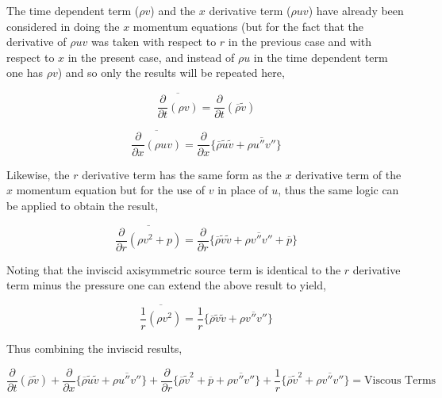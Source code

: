 	The time dependent term ($\rho v$) and the $x$ derivative term ($\rho u v$) have already been
considered in doing the $x$ momentum equations (but for the fact that the derivative of $\rho u v$ was taken
with respect to $r$ in the previous case and with respect to $x$ in the present case, and instead of $\rho u$
in the time dependent term one has $\rho v$) and so only the results will be repeated here,

\begin{displaymath}
	\overline{\frac{\partial}{\partial t}(\rho v)} = \frac{\partial}{\partial t}(\overline{\rho}\tilde{v})
\end{displaymath}

\begin{displaymath}
	\overline{\frac{\partial}{\partial x}(\rho uv)} = \frac{\partial}{\partial x}\Big\{\overline{\rho}\tilde{u}\tilde{v} +
	\overline{\rho u'' v''}\Big\}
\end{displaymath}

	Likewise, the $r$ derivative term has the same form as the $x$ derivative term of the $x$ momentum equation
but for the use of $v$ in place of $u$, thus the same logic can be applied to obtain the result,

\begin{displaymath}
	\overline{\frac{\partial}{\partial r}(\rho v^2 + p)} = \frac{\partial}{\partial r}\Big\{
	\overline{\rho}\tilde{v}\tilde{v} + \overline{\rho v'' v''} + \overline{p}\Big\}
\end{displaymath}

	Noting that the inviscid axisymmetric source term is identical to the $r$ derivative term minus the 
pressure one can extend the above result to yield,

\begin{displaymath}
	\overline{\frac{1}{r}(\rho v^2)} = \frac{1}{r}\Big\{
	\overline{\rho}\tilde{v}\tilde{v} + \overline{\rho v'' v''}\Big\}
\end{displaymath}

	Thus combining the inviscid results,

\begin{equation}
	\frac{\partial}{\partial t}(\overline{\rho}\tilde{v}) + \frac{\partial}{\partial x}\Big\{
	\overline{\rho}\tilde{u}\tilde{v} + \overline{\rho u'' v''}\Big\} + \frac{\partial}{\partial r}\Big\{
	\overline{\rho}\tilde{v}^2 + \overline{p} + \overline{\rho v'' v''}\Big\} + \frac{1}{r}\Big\{
	\overline{\rho}\tilde{v}^2 + \overline{\rho v'' v''}\Big\} = \textrm{Viscous Terms}
\label{eqn:rmomturbinv}
\end{equation}

